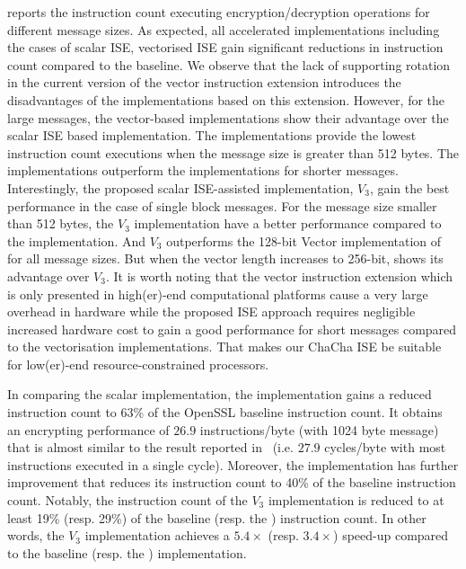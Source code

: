  reports the instruction count executing encryption/decryption operations for different message sizes. 
As expected, all accelerated implementations including the cases of scalar ISE, vectorised ISE gain significant reductions in instruction count compared to the baseline. 
We observe that the lack of supporting rotation in the current version of the vector instruction extension introduces the disadvantages of the implementations based on this extension. 
However, for the large messages, the vector-based implementations show their advantage over the scalar ISE based implementation. 
The  implementations provide the lowest instruction count executions when the message size is greater than 512 bytes. 
The  implementations outperform the  implementations for shorter messages.
Interestingly, the proposed scalar ISE-assisted implementation, $V_3$, gain the best performance in the case of single block messages.
For the message size smaller than 512 bytes, the $V_3$ implementation have a better performance compared to the  implementation. 
And $V_3$ outperforms the 128-bit Vector implementation of  for all message sizes. But when the vector length increases to 256-bit,  shows its advantage over $V_3$. It is worth noting that the vector instruction extension which is only presented in high(er)-end computational platforms cause a very large overhead in hardware while the proposed ISE approach requires negligible increased hardware cost to gain a good performance for short messages compared to the vectorisation implementations. That makes our ChaCha ISE be suitable for low(er)-end resource-constrained processors.

In comparing the scalar implementation, the  implementation gains a reduced instruction count to 63\% of the OpenSSL baseline instruction count.
It obtains an encrypting performance of $26.9$ instructions/byte (with 1024 byte message) that is almost similar to the result reported in~\cite{Sto:19} (i.e. $27.9$ cycles/byte with most instructions executed in a single cycle). Moreover, the  implementation has further improvement that reduces its instruction count to 40\% of the baseline instruction count.
Notably, the instruction count of the $V_3$ implementation is reduced to at least 19\% (resp. 29\%) of the baseline (resp. the ) instruction count. In other words, the $V_3$ implementation achieves a $5.4\times$ (resp. $3.4\times$) speed-up compared to the baseline (resp. the ) implementation.

